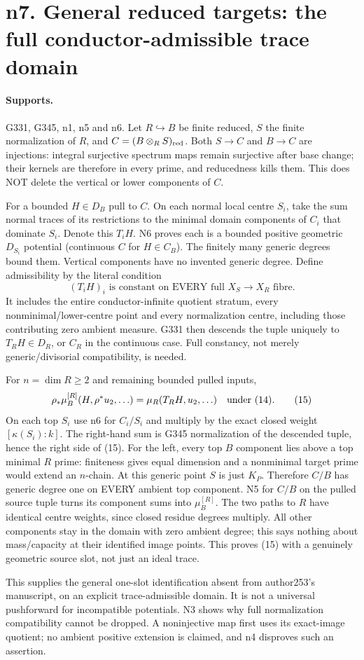 \section{n7. General reduced targets: the full conductor-admissible trace domain}
\paragraph{Supports.} G331, G345, n1, n5 and n6.
Let $R\hookrightarrow B$ be finite reduced, $S$ the finite normalization of $R$, and $C=(B\otimes_RS)_{\rm red}$. Both $S\to C$ and $B\to C$ are injections: integral surjective spectrum maps remain surjective after base change; their kernels are therefore in every prime, and reducedness kills them. This does NOT delete the vertical or lower components of $C$.

For a bounded $H\in D_B$ pull to $C$. On each normal local centre $S_i$, take the sum normal traces of its restrictions to the minimal domain components of $C_i$ that dominate $S_i$. Denote this $T_iH$. N6 proves each is a bounded positive geometric $D_{S_i}$ potential (continuous $C$ for $H\in C_B$). The finitely many generic degrees bound them. Vertical components have no invented generic degree. Define admissibility by the literal condition
\[
 (T_iH)_i\text{ is constant on EVERY full }X_S\to X_R\text{ fibre}. \tag{14}
\]
It includes the entire conductor-infinite quotient stratum, every nonminimal/lower-centre point and every normalization centre, including those contributing zero ambient measure. G331 then descends the tuple uniquely to $T_RH\in D_R$, or $C_R$ in the continuous case. Full constancy, not merely generic/divisorial compatibility, is needed.

For $n=\dim R\ge2$ and remaining bounded pulled inputs,
\[
 \rho_*\mu_B^{[R]}(H,\rho^*u_2,\ldots)
 =\mu_R(T_RH,u_2,\ldots)\quad\hbox{under (14)}. \tag{15}
\]
On each top $S_i$ use n6 for $C_i/S_i$ and multiply by the exact closed weight $[\kappa(S_i):k]$. The right-hand sum is G345 normalization of the descended tuple, hence the right side of (15). For the left, every top $B$ component lies above a top minimal $R$ prime: finiteness gives equal dimension and a nonminimal target prime would extend an $n$-chain. At this generic point $S$ is just $K_P$. Therefore $C/B$ has generic degree one on EVERY ambient top component. N5 for $C/B$ on the pulled source tuple turns its component sums into $\mu_B^{[R]}$. The two paths to $R$ have identical centre weights, since closed residue degrees multiply. All other components stay in the domain with zero ambient degree; this says nothing about mass/capacity at their identified image points. This proves (15) with a genuinely geometric source slot, not just an ideal trace.

This supplies the general one-slot identification absent from author253's manuscript, on an explicit trace-admissible domain. It is not a universal pushforward for incompatible potentials. N3 shows why full normalization compatibility cannot be dropped. A noninjective map first uses its exact-image quotient; no ambient positive extension is claimed, and n4 disproves such an assertion.
